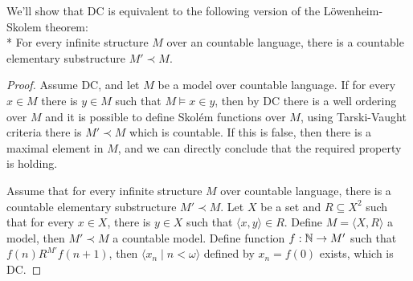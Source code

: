 \subquestion{}
We'll show that DC is equivalent to the following version of the L\"owenheim-Skolem theorem: \\*
For every infinite structure $M$ over an countable language, there is a countable elementary substructure $M' \prec M$.
\begin{proof}
	Assume DC\@, and let $M$ be a model over countable language.
	If for every $x \in M$ there is $y \in M$ such that $M \models x \in y$, then by DC there is a well ordering over $M$ and it is possible to define Skol\'em functions over $M$,
	using Tarski-Vaught criteria there is $M' \prec M$ which is countable.
	If this is false, then there is a maximal element in $M$, and we can directly conclude that the required property is holding.

	Assume that for every infinite structure $M$ over countable language, there is a countable elementary substructure $M' \prec M$.
	Let $X$ be a set and $R \subseteq X^2$ such that for every $x \in X$, there is $y \in X$ such that $\langle x, y \rangle \in R$.
	Define $M = \langle X, R \rangle$ a model, then $M' \prec M$ a countable model.
	Define function $f : \mathbb{N} \to M'$ such that $f(n) R^{M'} f(n + 1)$, then $\langle x_n \mid n < \omega \rangle$ defined by $x_n = f(0)$ exists, which is DC\@.
\end{proof}

